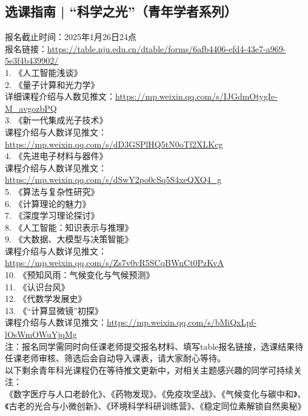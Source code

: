 \documentclass[letterpaper, 12pt]{article}
\begin{document}
\begin{multicols}{2}







\section{选课指南 | “科学之光”（青年学者系列）}
报名截止时间：2025年1月26日24点\\
报名链接：\url{https://table.nju.edu.cn/dtable/forms/6afb4406-efd4-43e7-a969-5e3f4b439902/}\\
1. 《人工智能浅谈》\\
2. 《量子计算和光力学》\\
详细课程介绍与人数见推文：\url{https://mp.weixin.qq.com/s/IJGdmOtygIe-M_avgozbPQ}\\
3. 《新一代集成光子技术》\\
课程介绍与人数详见推文：\url{https://mp.weixin.qq.com/s/dD3GSPlHQ5tN0oTf2XLKcg}\\
4. 《先进电子材料与器件》\\
课程介绍与人数详见推文：\url{https://mp.weixin.qq.com/s/dSwY2po0cSq5S4xeQXQ4_g}\\
5. 《算法与复杂性研究》\\
6. 《计算理论的魅力》\\
7. 《深度学习理论探讨》\\
8. 《人工智能：知识表示与推理》\\
9. 《大数据、大模型与决策智能》\\
课程介绍与人数详见推文：\url{https://mp.weixin.qq.com/s/Zs7v0vR5SCqBWnCt0PzKvA}\\
10. 《预知风雨：气候变化与气候预测》\\
11. 《认识台风》\\
12. 《代数学发展史》\\
13. 《“计算显微镜”初探》\\
课程介绍与人数详见推文：\url{https://mp.weixin.qq.com/s/bMiQxLpf-lOsWmOWuYjqMg}\\
注：报名同学需同时向任课老师提交报名材料、填写table报名链接，选课结果待任课老师审核、筛选后会自动导入课表，请大家耐心等待。\\
以下剩余青年科光课程仍在等待推文更新中，对相关主题感兴趣的同学可持续关注：\\
《数字医疗与人口老龄化》、《药物发现》、《免疫攻坚战》、《气候变化与碳中和》、《古老的光合与小微创新》、《环境科学科研训练营》、《稳定同位素解锁自然奥秘》\\




\end{multicols}
\end{document}
